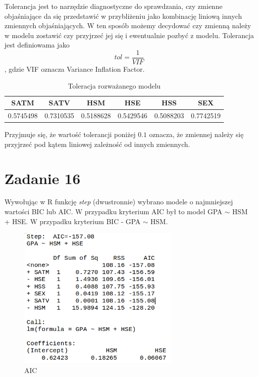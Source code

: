 \documentclass[9pt]{article}  %
\begin{document}
Tolerancja jest to narzędzie diagnostyczne do sprawdzania, czy zmienne objaśniające da się przedstawić w przybliżeniu jako kombinację liniową innych zmiennych objaśniających. W ten sposób możemy decydować czy zmienną należy w modelu zostawić czy przyjrzeć jej się i ewentualnie pozbyć z modelu. Tolerancja jest definiowama jako 
$$tol = \frac{1}{VIF}$$
, gdzie VIF oznacza Variance Inflation Factor. \newline


  \begin{table}[H]
  \centering
  
    \begin{tabular}{c|c|c|c|c|c}
     SATM   &   SATV    &   HSM    &   HSE   &    HSS   &    SEX   \\ \hline
     0.5745498 & 0.7310535 & 0.5188628 & 0.5429546 & 0.5088203 & 0.7742519 
  \end{tabular} 
  \caption{Toleracja rozważanego modelu}
  \end{table}
  
  Przyjmuje się, że wartość tolerancji poniżej $0.1$ oznacza, że zmiennej należy się przyjrzeć pod kątem liniowej zależność od innych zmiennych. 

\section{Zadanie 16}
  Wywołując w R funkcję \textit{step} (dwustronnie) wybrano modele o najmniejszej wartości BIC lub AIC. W przypadku kryterium AIC był to model GPA $\sim$ HSM + HSE. W przypadku kryterium BIC - GPA $\sim$ HSM.

    \begin{figure}[H]
      \centering
      \includegraphics[width=0.7\textwidth]{161.png}
      \caption{AIC}
    \end{figure} 
\end{document}
